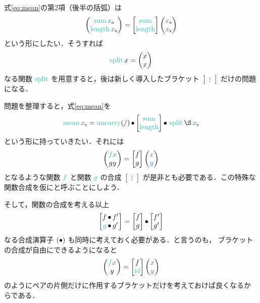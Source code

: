 \documentclass[a5paper,twoside,fleqn,draft]{jsbook}
\begin{document}
式\eqref{eq:mean}の第2項（後半の括弧）は
\begin{equation}
  \hPairWith{\hSum\hListVar{x}}{\mLength\hListVar{x}}
  =\begin{bmatrix}
  \hSum\\
  \mLength
  \end{bmatrix}
  \hPairWith{\hListVar{x}}{\hListVar{x}}
\end{equation}
という形にしたい．そうすれば
\begin{equation}
  \mSplit x
  =\hPairWith{x}{x}
\end{equation}
なる関数 $\mSplit$ を用意すると，後は新しく導入したブラケット
$\begin{bmatrix}\vdots\end{bmatrix}$ だけの問題になる．

問題を整理すると，式\eqref{eq:mean}を
\begin{equation}
  \mMean\hListVar{x}
  =\hUncurry(/)
  \hCompose
  \begin{bmatrix}
    \hSum\\
    \mLength
  \end{bmatrix}
  \hCompose{}
  \mSplit
  \hApply
  \hListVar{x}
\end{equation}
という形に持っていきたい．それには
\begin{equation}
  \hPairWith{\hFunc{f}\hVar{x}}{gy}
  =
  \begin{bmatrix}
    f\\
    g
  \end{bmatrix}
  \hPairWith{\hVar{x}}{\hVar{y}}
\end{equation}
となるような関数 $\hFunc{f}$ と関数 $\hFunc{g}$ の合成
$\begin{bmatrix}\vdots\end{bmatrix}$ が是非とも必要である．この特殊な
  関数合成を仮にと呼ぶことにしよう．

そして，関数の合成を考える以上
\begin{equation}
  \begin{bmatrix}
    f\hCompose f'\\
    \hFunc{g}\hCompose g'
  \end{bmatrix}
  =
  \begin{bmatrix}
    f\\
    g
  \end{bmatrix}
  \mCompCat
  \begin{bmatrix}
    f'\\
    g'
  \end{bmatrix}
\end{equation}
なる合成演算子 $(\operatorname{\bullet})$ も同時に考えておく必要がある．と言うのも，
ブラケットの合成が自由にできるようになると
\begin{equation}
  \hPairWith{\hFunc{f}\hVar{x}}{y}
  =
  \begin{bmatrix}
    f\\
    \mId
  \end{bmatrix}
  \hPairWith{\hVar{x}}{\hVar{y}}
\end{equation}
のようにペアの片側だけに作用するブラケットだけを考えておけば良くなるか
らである．
\end{document}

